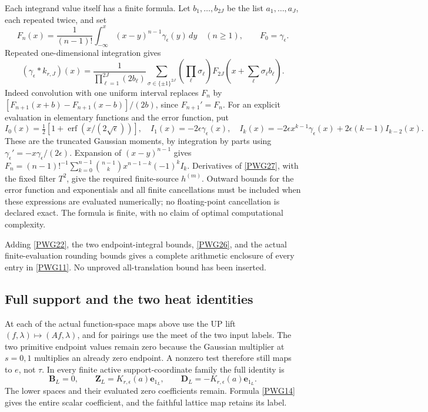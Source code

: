 \documentclass[11pt,a4paper]{article}
\theoremstyle{definition}\newtheorem{definition}[theorem]{Definition}
\begin{document}
Each integrand value itself has a finite formula. Let $b_1,\ldots,b_{2J}$ be the list $a_1,\ldots,a_J$, each repeated twice, and set
\[
 F_n(x)=\frac1{(n-1)!}\int_{-\infty}^x(x-y)^{n-1}\gamma_\epsilon(y)\,dy
 \quad(n\ge1),\qquad F_0=\gamma_\epsilon.
\]
Repeated one-dimensional integration gives
\begin{equation}
 (\gamma_\epsilon*k_{r,J})(x)=
 \frac1{\prod_{\ell=1}^{2J}(2b_\ell)}
 \sum_{\sigma\in\{\pm1\}^{2J}}\left(\prod_\ell\sigma_\ell\right)
 F_{2J}\left(x+\sum_\ell\sigma_\ell b_\ell\right).
                                                               \tag{PWG27}\label{PWG27}
\end{equation}
Indeed convolution with one uniform interval replaces $F_n$ by
$[F_{n+1}(x+b)-F_{n+1}(x-b)]/(2b)$, since $F_{n+1}'=F_n$.
For an explicit evaluation in elementary functions and the error function, put
\[
 I_0(x)=\tfrac12[1+\operatorname{erf}(x/(2\sqrt\epsilon))],\quad
 I_1(x)=-2\epsilon\gamma_\epsilon(x),\quad
 I_k(x)=-2\epsilon x^{k-1}\gamma_\epsilon(x)
                   +2\epsilon(k-1)I_{k-2}(x).
\]
These are the truncated Gaussian moments, by integration by parts using
$\gamma_\epsilon'=-x\gamma_\epsilon/(2\epsilon)$.
Expansion of $(x-y)^{n-1}$ gives
$F_n=(n-1)!^{-1}\sum_{k=0}^{n-1}\binom{n-1}{k}x^{n-1-k}(-1)^kI_k$.
Derivatives of \eqref{PWG27}, with the fixed filter $T^2$, give the required finite-source $h^{(m)}$. Outward bounds for the error function and exponentials and all finite cancellations must be included when these expressions are evaluated numerically; no floating-point cancellation is declared exact. The formula is finite, with no claim of optimal computational complexity.

Adding \eqref{PWG22}, the two endpoint-integral bounds, \eqref{PWG26}, and the actual finite-evaluation rounding bounds gives a complete arithmetic enclosure of every entry in \eqref{PWG11}. No unproved all-translation bound has been inserted.

\subsection{Full support and the two heat identities}
At each of the actual function-space maps above use the UP lift
$(f,\lambda)\mapsto(Af,\lambda)$, and for pairings use the meet of the two input labels. The two primitive endpoint values remain zero because the Gaussian multiplier at $s=0,1$ multiplies an already zero endpoint. A nonzero test therefore still maps to $e$, not $\tau$. In every finite active support-coordinate family the full identity is
\begin{equation}
 \boldsymbol B_L=0,\qquad
 \boldsymbol Z_L=K_{r,\epsilon}(a)\mathbf e_{1_L},\qquad
 \boldsymbol D_L=-K_{r,\epsilon}(a)\mathbf e_{1_L}.
                                                               \tag{PWG23}\label{PWG23}
\end{equation}
The lower spaces and their evaluated zero coefficients remain. Formula \eqref{PWG14} gives the entire scalar coefficient, and the faithful lattice map retains its label.
\end{document}
